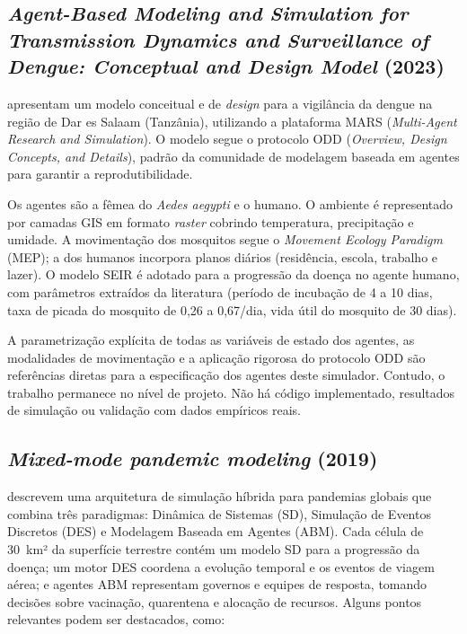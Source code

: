 \begin{apendicesenv}
\subsection{\textit{Agent-Based Modeling and Simulation for Transmission Dynamics
and Surveillance of Dengue: Conceptual and Design Model} (2023)}
\label{ap:pascoe2023}

 apresentam um modelo conceitual e de \textit{design}
para a vigilância da dengue na região de Dar es Salaam (Tanzânia), utilizando a
plataforma MARS (\textit{Multi-Agent Research and Simulation}). O modelo segue o
protocolo ODD (\textit{Overview, Design Concepts, and Details}), padrão da
comunidade de modelagem baseada em agentes para garantir a reprodutibilidade.

Os agentes são a fêmea do \textit{Aedes aegypti} e o humano. O ambiente é
representado por camadas GIS em formato \textit{raster} cobrindo temperatura,
precipitação e umidade. A movimentação dos mosquitos segue o
\textit{Movement Ecology Paradigm} (MEP); a dos humanos incorpora planos diários
(residência, escola, trabalho e lazer). O modelo SEIR é adotado para a progressão
da doença no agente humano, com parâmetros extraídos da literatura (período de
incubação de 4 a 10 dias, taxa de picada do mosquito de 0,26 a 0,67/dia, vida útil
do mosquito de 30 dias).

A parametrização explícita de todas as variáveis de estado dos agentes, as
modalidades de movimentação e a aplicação rigorosa do protocolo ODD são referências
diretas para a especificação dos agentes deste simulador. Contudo, o trabalho
permanece no nível de projeto. Não há código implementado, resultados de simulação
ou validação com dados empíricos reais.

\subsection{\textit{Mixed-mode pandemic modeling} (2019)}
\label{ap:bosch2019}

 descrevem uma arquitetura de simulação híbrida para
pandemias globais que combina três paradigmas: Dinâmica de Sistemas (SD), Simulação
de Eventos Discretos (DES) e Modelagem Baseada em Agentes (ABM). Cada célula de
30~km² da superfície terrestre contém um modelo SD para a progressão da doença;
um motor DES coordena a evolução temporal e os eventos de viagem aérea; e agentes
ABM representam governos e equipes de resposta, tomando decisões sobre vacinação,
quarentena e alocação de recursos. Alguns pontos relevantes podem ser destacados, como:


\end{apendicesenv}
